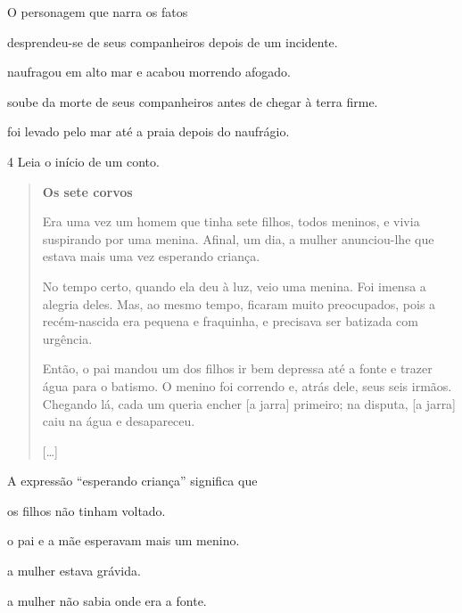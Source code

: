 O personagem que narra os fatos

\begin{escolha}
\item desprendeu-se de seus companheiros depois de um incidente.

\item naufragou em alto mar e acabou morrendo afogado.

\item soube da morte de seus companheiros antes de chegar à terra firme.

\item foi levado pelo mar até a praia depois do naufrágio.
\end{escolha}


\num{4} Leia o início de um conto.

\begin{quote}
\textbf{Os sete corvos}

Era uma vez um homem que tinha sete filhos, todos meninos, e vivia
suspirando por uma menina. Afinal, um dia, a mulher anunciou-lhe que
estava mais uma vez esperando criança.

No tempo certo, quando ela deu à luz, veio uma menina. Foi imensa a
alegria deles. Mas, ao mesmo tempo, ficaram muito preocupados, pois a
recém-nascida era pequena e fraquinha, e precisava ser batizada com
urgência.

Então, o pai mandou um dos filhos ir bem depressa até a fonte e trazer
água para o batismo. O menino foi correndo e, atrás dele, seus seis
irmãos. Chegando lá, cada um queria encher [a jarra] primeiro; na
disputa, [a jarra] caiu na água e desapareceu.

{[}\ldots{}{]}

\end{quote}

A expressão ``esperando criança'' significa que

\begin{escolha}
\item os filhos não tinham voltado.

\item o pai e a mãe esperavam mais um menino.

\item a mulher estava grávida.

\item a mulher não sabia onde era a fonte.
\end{escolha}

